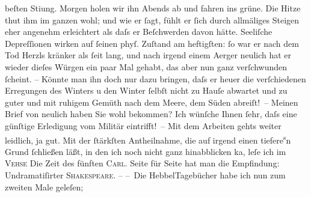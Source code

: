 \begin{ledgroupsized}[t]{13cm}
               beſten Sti{\geminationm}ung. Morgen holen wir ihn Abends ab und
               fahren ins grüne. Die Hitze thut ihm im ganzen wohl; und wie er ſagt, fühlt er ſich
               durch allmäliges Steigen eher angenehm erleichtert als daſs er Beſchwerden davon
               hätte. {\pb}Seeliſche Depreſſionen wirken auf ſeinen phyſ.
               Zuſtand am heftigſten: ſo war er nach dem Tod Herzls kränker als ſeit lang, und nach irgend einem Aerger neulich hat er
               wieder dieſes Würgen ein paar Mal gehabt, das aber nun ganz verſchwunden ſcheint. –
               Könnte man ihn doch nur dazu bringen, daſs er heuer die verſchiedenen Erregungen des
               Winters \introOben{}u den Winter ſelbſt\introOben{} nicht zu Hauſe abwartet und zu
               guter \label{T_L01424_2v}\label{T_L01424_2h} und mit ruhigem Gemüth
                  {\pb}nach dem Meere, dem Süden abreiſt! –\pend
           \pstart
           Meinen Brief von neulich haben Sie wohl bekommen? Ich wünſche Ihnen ſehr, daſs eine
               günſtige Erledigung vom Militär eintrifft! –\pend
           \pstart
           Mit dem Arbeiten gehts weiter leidlich, ja gut. Mit der ſtärkſten Antheilnahme, die
               auf irgend ein\introOben{}en\introOben{} tiefere\substVorne{}\textsuperscript{s}\substDazwischen{}n\substHinten{} Grund ſchließen läßt, in den ich noch nicht ganz hinabblicken ka{\geminationn}, leſe ich im \textsc{Vehse}{ }{\pb}Die Zeit des fünften \textsc{Carl}. Seite für Seite hat man die Empfindung: Undramatiſirter \textsc{Shakespeare}. –\pend
           \pstart
           – Die HebbelTagebücher habe ich nun zum zweiten Male geleſen;

\end{ledgroupsized}
